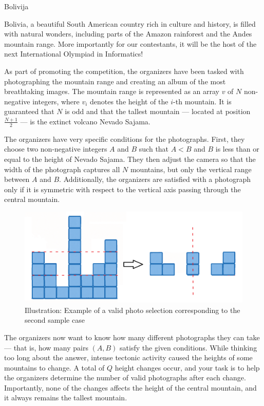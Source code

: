 \begin{statement}[
  problempoints=100,
  timelimit=2 seconds,
  memorylimit=512 MiB,
]{Bolivija}

Bolivia, a beautiful South American country rich in culture and history, 
is filled with natural wonders, including parts of the Amazon rainforest and the Andes mountain range.  
More importantly for our contestants, it will be the host of the next International Olympiad in Informatics!

As part of promoting the competition, the organizers have been tasked with 
photographing the mountain range and creating an album of the most breathtaking images.  
The mountain range is represented as an array $v$ of $N$ non-negative integers, 
where $v_i$ denotes the height of the $i$-th mountain.  
It is guaranteed that $N$ is odd and that the tallest mountain — located at position $\frac{N+1}{2}$ — 
is the extinct volcano Nevado Sajama.

The organizers have very specific conditions for the photographs.  
First, they choose two non-negative integers $A$ and $B$ such that $A < B$ and $B$ 
is less than or equal to the height of Nevado Sajama.  
They then adjust the camera so that the width of the photograph captures all $N$ mountains, 
but only the vertical range between $A$ and $B$.  
Additionally, the organizers are satisfied with a photograph only if it is symmetric 
with respect to the vertical axis passing through the central mountain.

\begin{figure}[!h]
      \centering
      \includegraphics[width=\linewidth]{pic/planine.png}
      \caption*{Illustration: Example of a valid photo selection corresponding to the second sample case}
\end{figure}

The organizers now want to know how many different photographs they can take — that is,  
how many pairs $(A, B)$ satisfy the given conditions.  
While thinking too long about the answer, intense tectonic activity 
caused the heights of some mountains to change.  
A total of $Q$ height changes occur, and your task is to help the organizers 
determine the number of valid photographs after each change.  
Importantly, none of the changes affects the height of the central mountain, 
and it always remains the tallest mountain.


\end{statement}
